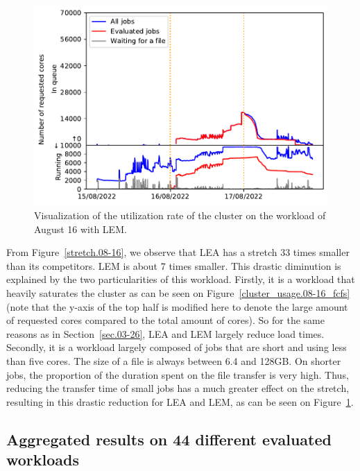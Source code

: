 \documentclass[conference,10pt]{IEEEtran}
\begin{document}
\begin{figure}[tb]\centering\includegraphics[scale=0.41]{../MBSS/plot/Cluster_usage/2022-08-16->2022-08-16_V10000_Fcfs_with_a_score_mixed_strategy_x500_x1_x0_x0_Used_nodes_Reduced_450_128_32_256_4_1024_core_by_core.pdf}\caption{Visualization of the utilization rate of the cluster on the workload of August 16 with LEM.}
\label{cluster_usage.08-16_lem}\end{figure}

From Figure~\ref{stretch.08-16}, we observe that LEA has a stretch 33 times smaller than
its competitors. LEM is about 7 times smaller. This drastic diminution is explained
by the two particularities of this workload.
Firstly, it is a workload that heavily saturates the cluster as can be seen on Figure~\ref{cluster_usage.08-16_fcfs}
(note that the y-axis of the top half is modified here to denote the large amount of requested cores compared to the total amount of cores).
So for the same reasons as in Section~\ref{sec.03-26}, LEA and LEM largely reduce load times.
Secondly, it is a workload largely composed of jobs that are short and using less than five cores.
The size of a file is always between 6.4 and 128GB.
On shorter jobs, the proportion of the duration spent on the file transfer is very high. 
Thus, reducing the transfer time of small jobs has a much greater effect on the stretch, resulting in this 
drastic reduction for LEA and LEM, as can be seen on Figure~\ref{cluster_usage.08-16_lem}.

\subsection{Aggregated results on 44 different evaluated workloads}
\end{document}
